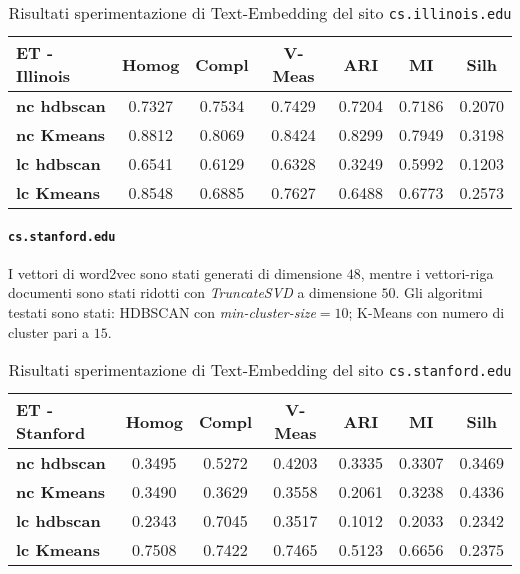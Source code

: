 \begin{table}[H]
	\begin{tabular}{| l | c | c | c | c | c | c |}
	\hline
	\textbf{ET - Illinois}  & \textbf{Homog} & \textbf{Compl} & \textbf{V-Meas}  & \textbf{ARI}  & \textbf{MI}  & \textbf{Silh} \\ [3ex] \hline
	\textbf{nc hdbscan} & 0.7327 & 0.7534 & 0.7429 & 0.7204 & 0.7186 & 0.2070\\ [3ex]
	 \hline 
	\textbf{nc Kmeans} & 0.8812 & 0.8069 & 0.8424 & 0.8299 & 0.7949 & 0.3198\\ [3ex]
	 \hline
	\textbf{lc hdbscan} & 0.6541 & 0.6129 & 0.6328 & 0.3249 & 0.5992 & 0.1203\\ [3ex]
	\hline
	\textbf{lc Kmeans} & 0.8548 & 0.6885 & 0.7627 & 0.6488 & 0.6773 & 0.2573\\ [3ex]
	\hline
	\end{tabular}
	\caption{Risultati sperimentazione di Text-Embedding del sito \texttt{cs.illinois.edu}}
	\label{metricheTextEmbedIll}
\end{table}

\paragraph{\texttt{cs.stanford.edu}} I vettori di word2vec sono stati generati di dimensione $48$, mentre i vettori-riga documenti sono stati ridotti con \textit{TruncateSVD} a dimensione $50$. Gli algoritmi testati sono stati: HDBSCAN con \textit{min-cluster-size}$=10$; K-Means con numero di cluster pari a $15$. 


\begin{table}[H]
	\begin{tabular}{| l | c | c | c | c | c | c |}
	\hline
	\textbf{ET - Stanford}  & \textbf{Homog} & \textbf{Compl} & \textbf{V-Meas}  & \textbf{ARI}  & \textbf{MI}  & \textbf{Silh} \\ [3ex] 
	\hline
	\textbf{nc hdbscan} & 0.3495 & 0.5272 & 0.4203 & 0.3335 & 0.3307 & 0.3469\\ [3ex]
	 \hline
	\textbf{nc Kmeans} & 0.3490 & 0.3629 & 0.3558 & 0.2061 & 0.3238 & 0.4336\\ [3ex]
	 \hline	
	\textbf{lc hdbscan} & 0.2343 & 0.7045 & 0.3517 & 0.1012 & 0.2033 & 0.2342\\ [3ex]
	\hline
	\textbf{lc Kmeans} & 0.7508 & 0.7422 & 0.7465 & 0.5123 & 0.6656 & 0.2375\\ [3ex]
	\hline
	\end{tabular}
	\caption{Risultati sperimentazione di Text-Embedding del sito \texttt{cs.stanford.edu}}
	\label{metricheTextEmbedStanf}
\end{table}

